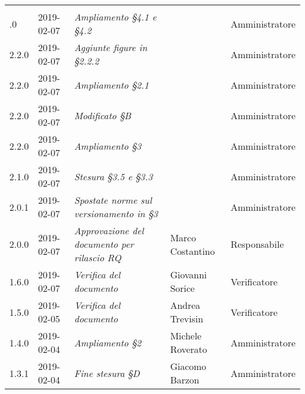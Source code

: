 \newpage 
\section*{}
	\begin{longtable}{C{2cm}|C{2.5cm}|C{4.5cm}|C{2.5cm}|C{3cm}}

		 &  &  &  &   \\
		.0 & 2019-02-07 & \emph{Ampliamento §4.1 e §4.2} &  & Amministratore \\
		\hline
		
		2.2.0 & 2019-02-07 & \emph{Aggiunte figure in §2.2.2} &  & Amministratore \\
		\hline
		
		2.2.0 & 2019-02-07 & \emph{Ampliamento §2.1} &  & Amministratore \\
		\hline
		
		2.2.0 & 2019-02-07 & \emph{Modificato §B} &  & Amministratore \\
		\hline
		
		2.2.0 & 2019-02-07 & \emph{Ampliamento §3} &  & Amministratore \\
		\hline
		
		2.1.0 & 2019-02-07 & \emph{Stesura §3.5 e §3.3} &  & Amministratore \\
		\hline
		
		2.0.1 & 2019-02-07 & \emph{Spostate norme sul versionamento in §3} &  & Amministratore \\
		\hline
		
		2.0.0 & 2019-02-07 & \emph{Approvazione del documento per rilascio RQ} & Marco Costantino & Responsabile \\
		\hline
		
		1.6.0 & 2019-02-07 & \emph{Verifica del documento}  & Giovanni Sorice & Verificatore  \\
		\hline
		
		1.5.0 & 2019-02-05 & \emph{Verifica del documento} & Andrea Trevisin & Verificatore  \\
		\hline
		
		1.4.0 & 2019-02-04 & \emph{Ampliamento §2} & Michele Roverato & Amministratore  \\
		\hline
		
		 1.3.1 & 2019-02-04 & \emph{Fine stesura §D} & Giacomo Barzon & Amministratore \\
		\hline
		

\end{longtable}
